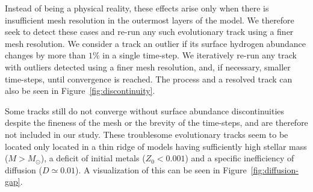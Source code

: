 Instead of being a physical reality, these effects arise only when there is insufficient mesh resolution in the outermost layers of the model. We therefore seek to detect these cases and re-run any such evolutionary track using a finer mesh resolution. We consider a track an outlier if its surface hydrogen abundance changes by more than $1\%$ in a single time-step. We iteratively re-run any track with outliers detected using a finer mesh resolution, and, if necessary, smaller time-steps, until convergence is reached. The process and a resolved track can also be seen in Figure~\ref{fig:discontinuity}. 

Some tracks still do not converge without surface abundance discontinuities despite the fineness of the mesh or the brevity of the time-steps, and are therefore not included in our study. These troublesome evolutionary tracks seem to be located only located in a thin ridge of models having sufficiently high stellar mass (${M > M_\odot}$), a deficit of initial metals (${Z_0 < 0.001}$) and a specific inefficiency of diffusion (${D \simeq 0.01}$). A visualization of this can be seen in Figure~\ref{fig:diffusion-gap}.

